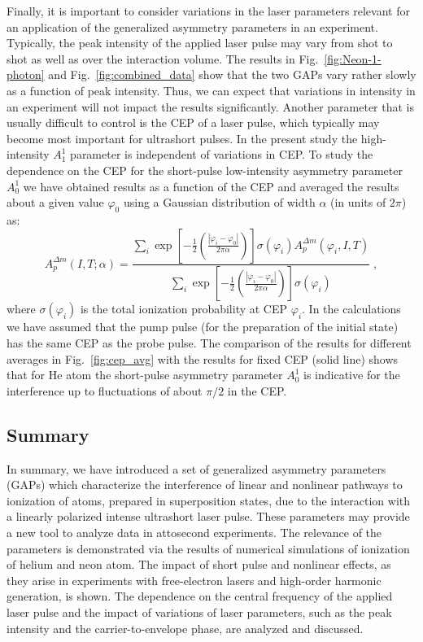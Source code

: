 Finally, it is important to consider variations in the laser parameters relevant for an application of the generalized asymmetry parameters in an experiment. Typically, the peak intensity of the applied laser pulse may vary from shot to shot as well as over the interaction volume. The results in Fig.\ \ref{fig:Neon-1-photon} and Fig.\ \ref{fig:combined_data} show that the two GAPs vary rather slowly as a function of peak intensity. Thus, we can expect that variations in intensity in an experiment will not impact the results significantly. Another parameter that is usually difficult to control is the CEP of a laser pulse, which typically may become most important for ultrashort pulses. In the present study the high-intensity $A_1^{1}$ parameter is independent of variations in CEP. To study the dependence on the CEP for the short-pulse low-intensity asymmetry parameter $A_0^{1}$ we have obtained results as a function of the CEP and averaged the results about a given value $\varphi_0$ using a Gaussian distribution of width $\alpha$ (in units of $2\pi$) as: 
%
\begin{equation}
A_{p}^{\Delta m}(I, T; \alpha)
= 
\frac{\sum_i \exp\left[-\frac{1}{2}\left(\frac{|\varphi_i-\varphi_0|}{2\pi\alpha}\right)\right] \sigma(\varphi_i) A_{p}^{\Delta m}(\varphi_i,I,T) }
{\sum_i\exp\left[-\frac{1}{2}\left(\frac{|\varphi_i-\varphi_0|}{2\pi\alpha}\right)\right]\sigma(\varphi_i)}\; ,
    \label{eq:PAD_gauss_window}
\end{equation}
%
where $\sigma(\varphi_i)$ is the total ionization probability at CEP $\varphi_i$. 
In the calculations we have assumed that the pump pulse (for the preparation of the initial state) has the same CEP as the probe pulse.
The comparison of the results for different averages in Fig.\ \ref{fig:cep_avg} with the results for fixed CEP (solid line) shows that for He atom the short-pulse asymmetry parameter $A_0^1$ is indicative for the interference up to fluctuations of about $\pi/2$ in the CEP. 


\subsection{Summary}


In summary, we have introduced a set of generalized asymmetry parameters (GAPs) which characterize the interference of linear and nonlinear pathways to ionization of atoms, prepared in superposition states, due to the interaction with a linearly polarized intense ultrashort laser pulse. These parameters may provide a new tool to analyze data in attosecond experiments. The relevance of the parameters is demonstrated via the results of numerical simulations of ionization of helium and neon atom. The impact of short pulse and nonlinear effects, as they arise in experiments with free-electron lasers and high-order harmonic generation, is shown. The dependence on the central frequency of the applied laser pulse and the impact of variations of laser parameters, such as the peak intensity and the carrier-to-envelope phase, are analyzed and discussed.

